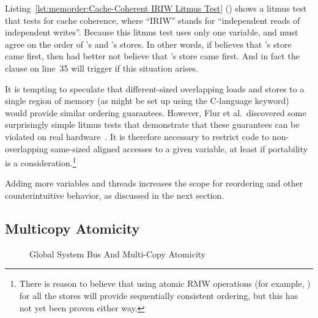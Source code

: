 Listing~\ref{lst:memorder:Cache-Coherent IRIW Litmus Test}
()
shows a litmus test that tests for cache coherence,
where ``IRIW'' stands
for ``independent reads of independent writes''.
Because this litmus test uses only one variable,
 and  must agree
on the order of 's and 's stores.
In other words, if  believes that 's store
came first, then  had better not believe that
's store came first.
And in fact the  clause on line~35 will trigger if this
situation arises.

It is tempting to speculate that different-sized overlapping loads 
and stores to a single region of memory (as might be set up using
the C-language  keyword) would provide similar ordering
guarantees.
However, Flur et al.~discovered some surprisingly simple
litmus tests that demonstrate that these guarantees can be violated on
real hardware~\cite{Flur:2017:MCA:3093333.3009839}.
It is therefore necessary to restrict code to non-overlapping
same-sized aligned accesses to a given variable, at least if portability
is a consideration.\footnote{
	There is reason to believe that using atomic RMW operations
	(for example, ) for all the stores will
	provide sequentially consistent ordering, but this has not
	yet been proven either way.}

Adding more variables and threads increases the scope for reordering
and other counterintuitive behavior, as discussed in the next section.

\subsection{Multicopy Atomicity}
\label{sec:memorder:Multicopy Atomicity}

\begin{figure}[tb]
\centering
{}
\caption{Global System Bus And Multi-Copy Atomicity}
\label{fig:memorder:Global System Bus And Multi-Copy Atomicity}
\end{figure}

